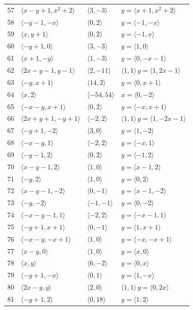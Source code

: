 \documentclass[11pt]{article}
\begin{document}
\begin{longtable}{@{}rlll@{}}
57 & $\langle x-y+1,x^{2}+2\rangle$ & $\langle 3,-3\rangle$ & $y=\langle x+1,x^{2}+2\rangle$\\
58 & $\langle -y-1,-x\rangle$ & $\langle 0,2\rangle$ & $y=\langle -1,-x\rangle$\\
59 & $\langle x,y+1\rangle$ & $\langle 0,2\rangle$ & $y=\langle -1,x\rangle$\\
60 & $\langle -y+1,0\rangle$ & $\langle 3,-3\rangle$ & $y=\langle 1,0\rangle$\\
61 & $\langle x+1,-y\rangle$ & $\langle 1,-3\rangle$ & $y=\langle 0,-x-1\rangle$\\
62 & $\langle 2x-y-1,y-1\rangle$ & $\langle 2,-11\rangle$ & $\langle 1,1\rangle\,y=\langle 1,2x-1\rangle$\\
63 & $\langle -y,x+1\rangle$ & $\langle 14,2\rangle$ & $y=\langle 0,x+1\rangle$\\
64 & $\langle x,2\rangle$ & $\langle -54,54\rangle$ & $x=\langle 0,-2\rangle$\\
65 & $\langle -x-y,x+1\rangle$ & $\langle 0,2\rangle$ & $y=\langle -x,x+1\rangle$\\
66 & $\langle 2x+y+1,-y+1\rangle$ & $\langle -2,2\rangle$ & $\langle 1,1\rangle\,y=\langle 1,-2x-1\rangle$\\
67 & $\langle -y+1,-2\rangle$ & $\langle 3,0\rangle$ & $y=\langle 1,-2\rangle$\\
68 & $\langle -x-y,1\rangle$ & $\langle -2,2\rangle$ & $y=\langle -x,1\rangle$\\
69 & $\langle -y-1,2\rangle$ & $\langle 0,2\rangle$ & $y=\langle -1,2\rangle$\\
70 & $\langle x-y-1,2\rangle$ & $\langle 1,0\rangle$ & $y=\langle x-1,2\rangle$\\
71 & $\langle -y,2\rangle$ & $\langle 1,0\rangle$ & $y=\langle 0,2\rangle$\\
72 & $\langle x-y-1,-2\rangle$ & $\langle 0,-1\rangle$ & $y=\langle x-1,-2\rangle$\\
73 & $\langle -y,-2\rangle$ & $\langle -1,-1\rangle$ & $y=\langle 0,-2\rangle$\\
74 & $\langle -x-y-1,1\rangle$ & $\langle -2,2\rangle$ & $y=\langle -x-1,1\rangle$\\
75 & $\langle -y+1,x+1\rangle$ & $\langle 0,-1\rangle$ & $y=\langle 1,x+1\rangle$\\
76 & $\langle -x-y,-x+1\rangle$ & $\langle 1,0\rangle$ & $y=\langle -x,-x+1\rangle$\\
77 & $\langle x-y,0\rangle$ & $\langle 1,0\rangle$ & $y=\langle x,0\rangle$\\
78 & $\langle x,y\rangle$ & $\langle 6,-2\rangle$ & $y=\langle 0,x\rangle$\\
79 & $\langle -y+1,-x\rangle$ & $\langle 0,1\rangle$ & $y=\langle 1,-x\rangle$\\
80 & $\langle 2x-y,y\rangle$ & $\langle 2,0\rangle$ & $\langle 1,1\rangle\,y=\langle 0,2x\rangle$\\
81 & $\langle -y+1,2\rangle$ & $\langle 0,18\rangle$ & $y=\langle 1,2\rangle$\\
\end{longtable}
\endgroup
\end{document}
